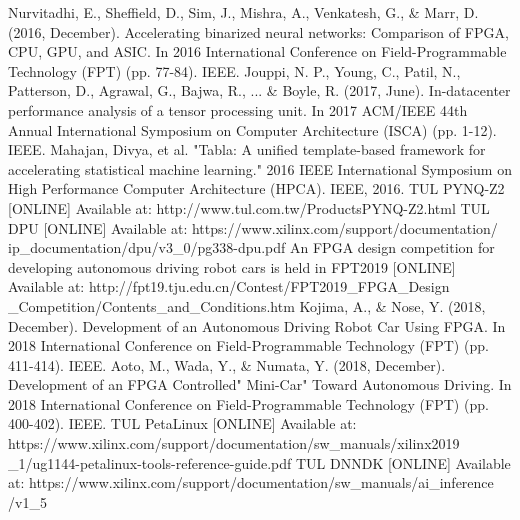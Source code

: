 \documentclass[conference]{IEEEtran}
\begin{document}
\begin{thebibliography}{00}

 Nurvitadhi, E., Sheffield, D., Sim, J., Mishra, A., Venkatesh, G., \& Marr, D. (2016, December). Accelerating binarized neural networks: Comparison of FPGA, CPU, GPU, and ASIC. In 2016 International Conference on Field-Programmable Technology (FPT) (pp. 77-84). IEEE.
 Jouppi, N. P., Young, C., Patil, N., Patterson, D., Agrawal, G., Bajwa, R., ... \& Boyle, R. (2017, June). In-datacenter performance analysis of a tensor processing unit. In 2017 ACM/IEEE 44th Annual International Symposium on Computer Architecture (ISCA) (pp. 1-12). IEEE.
 Mahajan, Divya, et al. "Tabla: A unified template-based framework for accelerating statistical machine learning." 2016 IEEE International Symposium on High Performance Computer Architecture (HPCA). IEEE, 2016.
 TUL PYNQ-Z2 [ONLINE] Available at: http://www.tul.com.tw/ProductsPYNQ-Z2.html  
 TUL DPU [ONLINE] Available at: https://www.xilinx.com/support/documentation/ ip\_documentation/dpu/v3\_0/pg338-dpu.pdf
 An FPGA design competition for developing autonomous driving robot cars is held in FPT2019 [ONLINE] Available at: http://fpt19.tju.edu.cn/Contest/FPT2019\_FPGA\_Design \_Competition/Contents\_and\_Conditions.htm
 Kojima, A., \& Nose, Y. (2018, December). Development of an Autonomous Driving Robot Car Using FPGA. In 2018 International Conference on Field-Programmable Technology (FPT) (pp. 411-414). IEEE.
 Aoto, M., Wada, Y., \& Numata, Y. (2018, December). Development of an FPGA Controlled" Mini-Car" Toward Autonomous Driving. In 2018 International Conference on Field-Programmable Technology (FPT) (pp. 400-402). IEEE.
 TUL PetaLinux [ONLINE] Available at: https://www.xilinx.com/support/documentation/sw\_manuals/xilinx2019 \_1/ug1144-petalinux-tools-reference-guide.pdf
 TUL DNNDK [ONLINE] Available at: https://www.xilinx.com/support/documentation/sw\_manuals/ai\_inference /v1\_5
\end{thebibliography}
\vspace{12pt}
\end{document}
